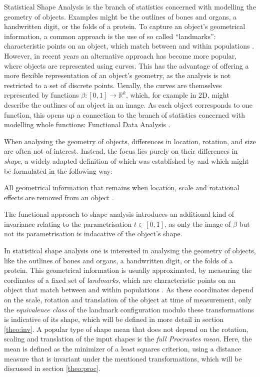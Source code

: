 Statistical Shape Analysis is the branch of statistics concerned with modelling the geometry of objects.
Examples might be the outlines of bones and organs, a handwritten digit, or the folds of a protein.
To capture an object's geometrical information, a common approach is the use of so called \enquote{landmarks}: characteristic points on an object, which match between and within populations \parencite[see][3]{DrydenMardia2016}.
However, in recent years an alternative approach has become more popular, where objects are represented using curves.
This has the advantage of offering a more flexible representation of an object's geometry, as the analysis is not restricted to a set of discrete points.
Usually, the curves are themselves represented by functions $\beta : [0,1] \rightarrow \mathbb{R}^k$, which, for example in 2D, might describe the outlines of an object in an image. 
As each object corresponds to one function, this opens up a connection to the branch of statistics concerned with modelling whole functions: Functional Data Analysis \parencite[see e.g.][]{Ramsay2006}.

When analysing the geometry of objects, differences in location, rotation, and size are often not of interest.
Instead, the focus lies purely on their differences in  \textit{shape}, a widely adapted definition of which was established by \cite{Kendall1977} and which might be formulated in the following way:
\begin{definition}[Shape] 
    All geometrical information that remains when location, scale and rotational effects are removed from an object \parencite[see][1]{DrydenMardia2016}.
\end{definition}
\noindent The functional approach to shape analysis introduces an additional kind of invariance relating to the parametrisation $t \in [0,1]$, as only the image of $\beta$ but not its parametrisation is indacative of the object's shape.

\newpage
In statistical shape analysis one is interested in analysing the geometry of
objects, like the outlines of bones and organs, a handwritten digit, or the
folds of a protein.
\noindent This geometrical information is usually approximated, by measuring
the cordinates of a fixed set of \textit{landmarks}, which are characteristic
points on an object that match between and within populations
\parencite[see][3]{DrydenMardia2016}.
As these coordinates depend on the scale, rotation and translation of the
object at time of measurement, only the \textit{equivalence class} of the
landmark configuration modulo these transformations is indicative of its shape,
which will be defined in more detail in section \ref{theo:inv}.
A popular type of shape mean that does not depend on the rotation, scaling and
translation of the input shapes is the \textit{full Procrustes mean}.
Here, the mean is defined as the minimizer of a least squares criterion, using
a distance measure that is invariant under the mentioned transformations, which
will be discussed in section \ref{theo:proc}.


